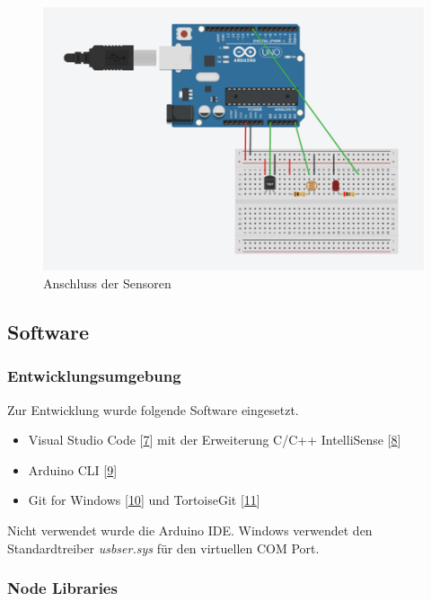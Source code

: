 \documentclass[
  ngerman,
  a4paper,
  12pt]{scrartcl}
\providecommand{\tightlist}{%
  \setlength{\itemsep}{0pt}\setlength{\parskip}{0pt}}
\begin{document}
\begin{figure}
\centering
\includegraphics{img/anschluss.png}
\caption{Anschluss der Sensoren}
\end{figure}

\hypertarget{software}{%
\subsection{Software}\label{software}}

\hypertarget{entwicklungsumgebung}{%
\subsubsection{Entwicklungsumgebung}\label{entwicklungsumgebung}}

Zur Entwicklung wurde folgende Software eingesetzt.

\begin{itemize}
\tightlist
\item
  Visual Studio Code {[}\protect\hyperlink{ref-vscode}{7}{]} mit der
  Erweiterung C/C++ IntelliSense
  {[}\protect\hyperlink{ref-intellisense}{8}{]}
\item
  Arduino CLI {[}\protect\hyperlink{ref-arduinoCli}{9}{]}
\item
  Git for Windows {[}\protect\hyperlink{ref-gitForWindows}{10}{]} und
  TortoiseGit {[}\protect\hyperlink{ref-tortoiseGit}{11}{]}
\end{itemize}

Nicht verwendet wurde die Arduino IDE. Windows verwendet den
Standardtreiber \emph{usbser.sys} für den virtuellen COM Port.

\hypertarget{node-libraries}{%
\subsubsection{Node Libraries}\label{node-libraries}}
\end{document}
